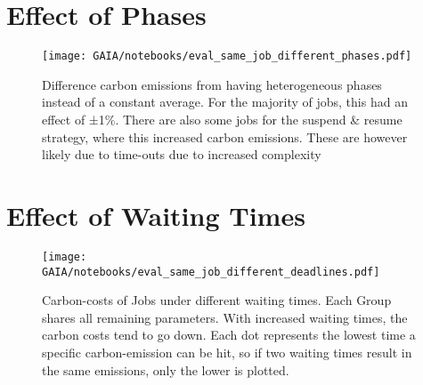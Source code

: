 
\section{Effect of Phases}

\begin{figure}
    \texttt{[image: GAIA/notebooks/eval\_same\_job\_different\_phases.pdf]}
    \caption[short]{Difference carbon emissions from having heterogeneous phases instead of a constant average. For the majority of jobs, this had an effect of ±1\%. There are also some jobs for the suspend \& resume strategy, where this increased carbon emissions. These are however likely due to time-outs due to increased complexity}

    \label{fig:different_phases_no_effect_lol}
\end{figure}

\section{Effect of Waiting Times}

\begin{figure}
    \texttt{[image: GAIA/notebooks/eval\_same\_job\_different\_deadlines.pdf]}
    \caption[short]{Carbon-costs of Jobs under different waiting times. Each Group shares all remaining parameters.
    With increased waiting times, the carbon costs tend to go down. Each dot represents the lowest time a specific carbon-emission can be hit, so if two waiting times result in the same emissions, only the lower is plotted.}

    \label{fig:eval_different_deadlines}
\end{figure}
